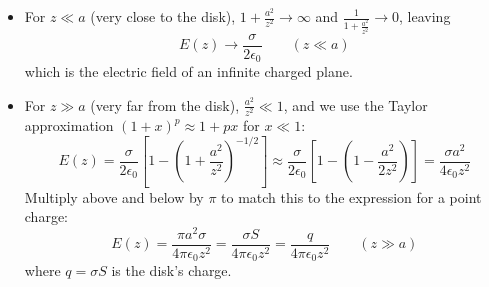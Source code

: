 \documentclass[11pt, a4paper]{article}
\begin{document}
\begin{itemize}
	\item For $ z \ll a $ (very close to the disk), $ 1 + \frac{a^{2}}{z^{2}} \to \infty $ and $ \frac{1}{1 + \frac{a^{2}}{z^{2}}} \to 0$, leaving \vspace{-2mm}
	\begin{equation*}
		E(z) \to \frac{\sigma}{2\epsilon_{0}} \qquad (z \ll a)
	\end{equation*}
	which is the electric field of an infinite charged plane.
	
	\item For $ z \gg a $ (very far from the disk), $ \frac{a^{2}}{z^{2}} \ll 1 $, and we use the Taylor approximation $ (1 + x)^{p} \approx 1 + px $ for $ x \ll 1 $:
	\begin{equation*}
		E(z) = \frac{\sigma}{2\epsilon_{0}} \left[1 -  \left (1 + \frac{a^{2}}{z^{2}}\right )^{-1/2}\right] \approx \frac{\sigma}{2\epsilon_{0}}\left[ 1 - \left(1 - \frac{a^{2}}{2z^{2}}\right) \right] = \frac{\sigma a^{2}}{4\epsilon_{0}z^{2}}
	\end{equation*}
	Multiply above and below by $ \pi $ to match this to the expression for a point charge:
	\begin{equation*}
		E(z) = \frac{\pi a^{2} \sigma}{4\pi \epsilon_{0} z^{2}} = \frac{\sigma S}{4\pi \epsilon_{0}z^{2}} = \frac{q}{4\pi \epsilon_{0}z^{2}}  \qquad (z \gg a) 
	\end{equation*}
	where $ q = \sigma S $ is the disk's charge. 

\end{itemize}
\end{document}
